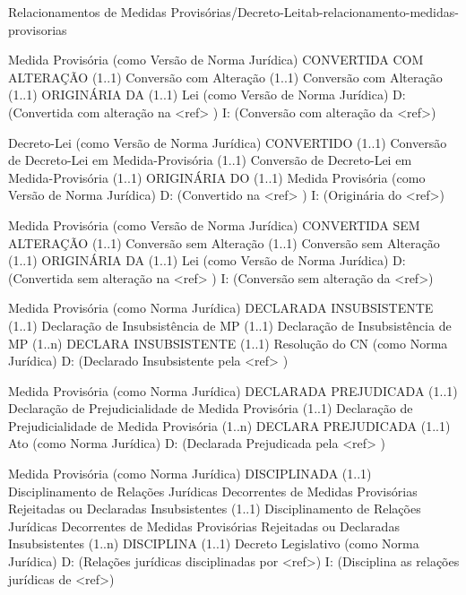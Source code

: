 \begin{tabelarelacionamento}{Relacionamentos
de Medidas Provisórias/Decreto-Lei}{tab-relacionamento-medidas-provisorias}

  \relacionamento
  	{Medida Provisória (como Versão de Norma Jurídica)}
 	{CONVERTIDA COM ALTERAÇÃO (1..1)}
 	{Conversão com Alteração}
 	{(1..1) Conversão com Alteração (1..1)}
 	{ORIGINÁRIA DA (1..1)}
 	{Lei (como Versão de Norma Jurídica)}
 	{D: (Convertida com alteração na <ref> )
	 \mypar
	 I: (Conversão com alteração da <ref>)}

  \relacionamento
  	{Decreto-Lei (como Versão de Norma Jurídica)}
 	{CONVERTIDO (1..1)}
 	{Conversão de Decreto-Lei em Medida-Provisória}
 	{(1..1) Conversão de Decreto-Lei em Medida-Provisória (1..1)}
 	{ORIGINÁRIA DO (1..1)}
 	{Medida Provisória (como Versão de Norma Jurídica)}
 	{D: (Convertido na <ref> )
	 \mypar
	 I: (Originária do <ref>)}

  \relacionamento
  	{Medida Provisória (como Versão de Norma Jurídica)}
 	{CONVERTIDA SEM ALTERAÇÃO (1..1)}
 	{Conversão sem Alteração}
 	{(1..1) Conversão sem Alteração (1..1)}
 	{ORIGINÁRIA DA (1..1)}
 	{Lei  (como Versão de Norma Jurídica)}
 	{D: (Convertida sem alteração na <ref> )
	 \mypar
	 I: (Conversão sem alteração da <ref>)}

  \relacionamento
  	{Medida Provisória (como Norma Jurídica)}
 	{DECLARADA INSUBSISTENTE (1..1)}
 	{Declaração de Insubsistência de MP}
 	{(1..1) Declaração de Insubsistência de MP (1..n)}
 	{DECLARA INSUBSISTENTE (1..1)}
 	{Resolução do CN (como Norma Jurídica)}
 	{D: (Declarado Insubsistente pela <ref> )}

  \relacionamento
  	{Medida Provisória (como Norma Jurídica)}
 	{DECLARADA PREJUDICADA (1..1)}
 	{Declaração de Prejudicialidade de Medida Provisória}
 	{(1..1) Declaração de Prejudicialidade de Medida Provisória (1..n)}
 	{DECLARA PREJUDICADA (1..1)}
 	{Ato (como Norma Jurídica)}
 	{D: (Declarada Prejudicada pela <ref> )}

  \relacionamento
  	{Medida Provisória (como Norma Jurídica)}
 	{DISCIPLINADA (1..1)}
    {Disciplinamento de Relações Jurídicas Decorrentes de Medidas Provisórias Rejeitadas ou Declaradas Insubsistentes} 
    {(1..1) Disciplinamento de Relações Jurídicas Decorrentes de Medidas Provisórias Rejeitadas ou Declaradas Insubsistentes (1..n)}
 	{DISCIPLINA (1..1)}
 	{Decreto Legislativo (como Norma Jurídica)}
 	{D: (Relações jurídicas disciplinadas  por <ref>)
	 \mypar
	 I: (Disciplina as relações jurídicas de <ref>)}


\end{tabelarelacionamento}
